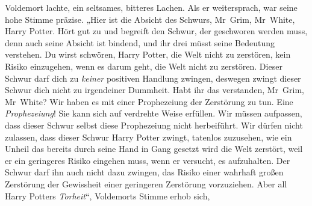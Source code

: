 Voldemort lachte, ein seltsames, bitteres Lachen. Als er weitersprach, war seine hohe Stimme präzise.
„Hier ist die Absicht des Schwurs, Mr~Grim, Mr~White, Harry Potter. Hört gut zu und begreift den Schwur, der geschworen werden muss, denn auch seine Absicht ist bindend, und ihr drei müsst seine Bedeutung verstehen. Du wirst schwören, Harry Potter, die Welt nicht zu zerstören, kein Risiko einzugehen, wenn es darum geht, die Welt nicht zu zerstören.
Dieser Schwur darf dich zu \emph{keiner} positiven Handlung zwingen, deswegen zwingt dieser Schwur dich nicht zu irgendeiner Dummheit. Habt ihr das verstanden, Mr~Grim, Mr~White? Wir haben es mit einer Prophezeiung der Zerstörung zu tun. Eine \emph{Prophezeiung}! Sie kann sich auf verdrehte Weise erfüllen. Wir müssen aufpassen, dass dieser Schwur selbst diese Prophezeiung nicht herbeiführt. Wir dürfen nicht zulassen, dass dieser Schwur Harry Potter zwingt, tatenlos zuzusehen, wie ein Unheil das bereits durch seine Hand in Gang gesetzt wird die Welt zerstört, weil er ein geringeres Risiko eingehen muss, wenn er versucht, es aufzuhalten. Der Schwur darf ihn auch nicht dazu zwingen, das Risiko einer wahrhaft großen Zerstörung der Gewissheit einer geringeren Zerstörung vorzuziehen. Aber all Harry Potters \emph{Torheit}“,
Voldemorts Stimme erhob sich,
